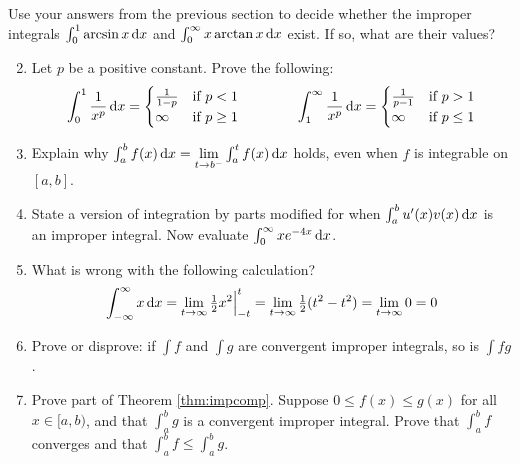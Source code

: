 \vfil\vfil\pagebreak

\begin{exercises}
\exstart Use your answers from the previous section to decide whether the improper integrals $\int_0^1\arcsin x\,{\mathrm{d} x}$ and $\int_0^\infty x\arctan x\,{\mathrm{d} x}$ exist. If so, what are their values?
\begin{enumerate}\setcounter{enumi}{1}
 	\item Let $p$ be a positive constant. Prove the following:
  \[\int_0^1\frac 1{x^p}\,{\mathrm{d} x}=\begin{cases}
  \frac 1{1-p}&\text{if }p<1\\
  \infty&\text{if }p\ge 1
  \end{cases}
  \qquad\qquad
  \int_1^\infty\frac 1{x^p}\,{\mathrm{d} x}=\begin{cases}
  \frac 1{p-1}&\text{if }p>1\\
  \infty&\text{if }p\le 1
  \end{cases}\]
  
  \goodbreak
  
  \item Explain why $\int_a^bf(x)\,{\mathrm{d} x}=\lim\limits_{t\to b^-}\int_a^tf(x)\,{\mathrm{d} x}$ holds, even when $f$ is integrable on $[a,b]$.  
  
  \item State a version of integration by parts modified for when $\int_a^b u'(x)v(x)\,{\mathrm{d} x}$ is an improper integral. Now evaluate $\int_0^\infty xe^{-4x}\,{\mathrm{d} x}$.
  
  \item What is wrong with the following calculation?
  \[\int_{-\infty}^\infty x\,{\mathrm{d} x}=\lim_{t\to\infty}\tfrac 12x^2\Big|_{-t}^t =\lim_{t\to\infty}\tfrac 12(t^2-t^2) =\lim_{t\to\infty}0=0\]
  
	\item Prove or disprove: if $\int f$ and $\int g$ are convergent improper integrals, so is $\int fg$.
  
  \item\label{ex:impropercomp} Prove part of Theorem \ref{thm:impcomp}. Suppose $0\le f(x)\le g(x)$ for all $x\in[a,b)$, and that $\int_a^bg$ is a convergent improper integral. Prove that $\int_a^bf$ converges and that $\int_a^bf\le\int_a^bg$.

  
  
%   
  

\end{enumerate}
\end{exercises}
